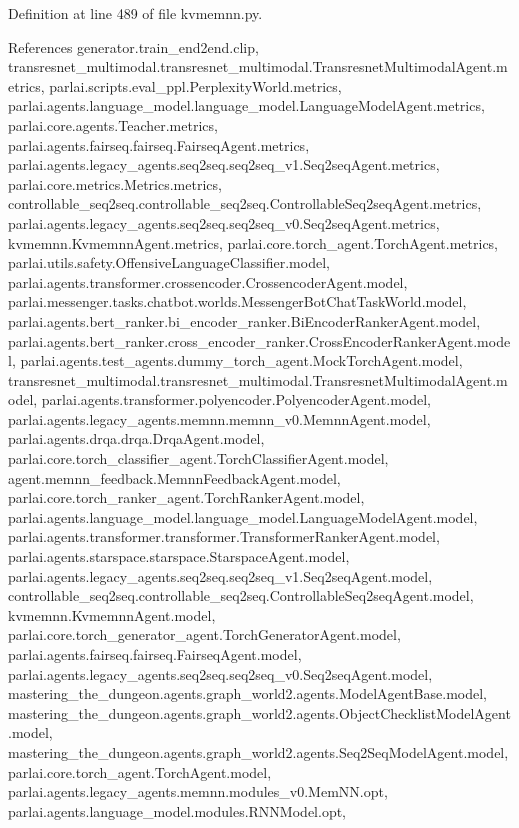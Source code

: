 Definition at line 489 of file kvmemnn.\+py.



References generator.\+train\+\_\+end2end.\+clip, transresnet\+\_\+multimodal.\+transresnet\+\_\+multimodal.\+Transresnet\+Multimodal\+Agent.\+metrics, parlai.\+scripts.\+eval\+\_\+ppl.\+Perplexity\+World.\+metrics, parlai.\+agents.\+language\+\_\+model.\+language\+\_\+model.\+Language\+Model\+Agent.\+metrics, parlai.\+core.\+agents.\+Teacher.\+metrics, parlai.\+agents.\+fairseq.\+fairseq.\+Fairseq\+Agent.\+metrics, parlai.\+agents.\+legacy\+\_\+agents.\+seq2seq.\+seq2seq\+\_\+v1.\+Seq2seq\+Agent.\+metrics, parlai.\+core.\+metrics.\+Metrics.\+metrics, controllable\+\_\+seq2seq.\+controllable\+\_\+seq2seq.\+Controllable\+Seq2seq\+Agent.\+metrics, parlai.\+agents.\+legacy\+\_\+agents.\+seq2seq.\+seq2seq\+\_\+v0.\+Seq2seq\+Agent.\+metrics, kvmemnn.\+Kvmemnn\+Agent.\+metrics, parlai.\+core.\+torch\+\_\+agent.\+Torch\+Agent.\+metrics, parlai.\+utils.\+safety.\+Offensive\+Language\+Classifier.\+model, parlai.\+agents.\+transformer.\+crossencoder.\+Crossencoder\+Agent.\+model, parlai.\+messenger.\+tasks.\+chatbot.\+worlds.\+Messenger\+Bot\+Chat\+Task\+World.\+model, parlai.\+agents.\+bert\+\_\+ranker.\+bi\+\_\+encoder\+\_\+ranker.\+Bi\+Encoder\+Ranker\+Agent.\+model, parlai.\+agents.\+bert\+\_\+ranker.\+cross\+\_\+encoder\+\_\+ranker.\+Cross\+Encoder\+Ranker\+Agent.\+model, parlai.\+agents.\+test\+\_\+agents.\+dummy\+\_\+torch\+\_\+agent.\+Mock\+Torch\+Agent.\+model, transresnet\+\_\+multimodal.\+transresnet\+\_\+multimodal.\+Transresnet\+Multimodal\+Agent.\+model, parlai.\+agents.\+transformer.\+polyencoder.\+Polyencoder\+Agent.\+model, parlai.\+agents.\+legacy\+\_\+agents.\+memnn.\+memnn\+\_\+v0.\+Memnn\+Agent.\+model, parlai.\+agents.\+drqa.\+drqa.\+Drqa\+Agent.\+model, parlai.\+core.\+torch\+\_\+classifier\+\_\+agent.\+Torch\+Classifier\+Agent.\+model, agent.\+memnn\+\_\+feedback.\+Memnn\+Feedback\+Agent.\+model, parlai.\+core.\+torch\+\_\+ranker\+\_\+agent.\+Torch\+Ranker\+Agent.\+model, parlai.\+agents.\+language\+\_\+model.\+language\+\_\+model.\+Language\+Model\+Agent.\+model, parlai.\+agents.\+transformer.\+transformer.\+Transformer\+Ranker\+Agent.\+model, parlai.\+agents.\+starspace.\+starspace.\+Starspace\+Agent.\+model, parlai.\+agents.\+legacy\+\_\+agents.\+seq2seq.\+seq2seq\+\_\+v1.\+Seq2seq\+Agent.\+model, controllable\+\_\+seq2seq.\+controllable\+\_\+seq2seq.\+Controllable\+Seq2seq\+Agent.\+model, kvmemnn.\+Kvmemnn\+Agent.\+model, parlai.\+core.\+torch\+\_\+generator\+\_\+agent.\+Torch\+Generator\+Agent.\+model, parlai.\+agents.\+fairseq.\+fairseq.\+Fairseq\+Agent.\+model, parlai.\+agents.\+legacy\+\_\+agents.\+seq2seq.\+seq2seq\+\_\+v0.\+Seq2seq\+Agent.\+model, mastering\+\_\+the\+\_\+dungeon.\+agents.\+graph\+\_\+world2.\+agents.\+Model\+Agent\+Base.\+model, mastering\+\_\+the\+\_\+dungeon.\+agents.\+graph\+\_\+world2.\+agents.\+Object\+Checklist\+Model\+Agent.\+model, mastering\+\_\+the\+\_\+dungeon.\+agents.\+graph\+\_\+world2.\+agents.\+Seq2\+Seq\+Model\+Agent.\+model, parlai.\+core.\+torch\+\_\+agent.\+Torch\+Agent.\+model, parlai.\+agents.\+legacy\+\_\+agents.\+memnn.\+modules\+\_\+v0.\+Mem\+N\+N.\+opt, parlai.\+agents.\+language\+\_\+model.\+modules.\+R\+N\+N\+Model.\+opt, 